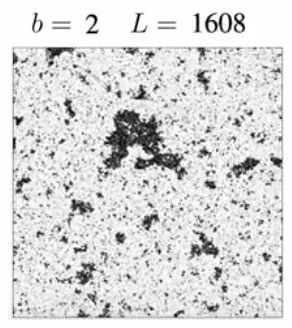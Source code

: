 \documentclass[]{article}
\begin{document}
\begin{figure}[H]
	\caption[Evolving $T=0.997T_c$ after \cite{ashton2012renormalization}]{Evolving $T=0.997T_c$ after \cite{ashton2012renormalization}. The system is strongly coupled, and one colour,in this case white, dominates more and more as we zoom out.}\label{fig:douglas:ashton1}
	\begin{subfigure}[t]{0.3\textwidth}
		\includegraphics[width=\textwidth]{DouglasAshton1-1}
	\end{subfigure}
	\begin{subfigure}[t]{0.3\textwidth}

\end{subfigure}
\end{figure}
\end{document}
